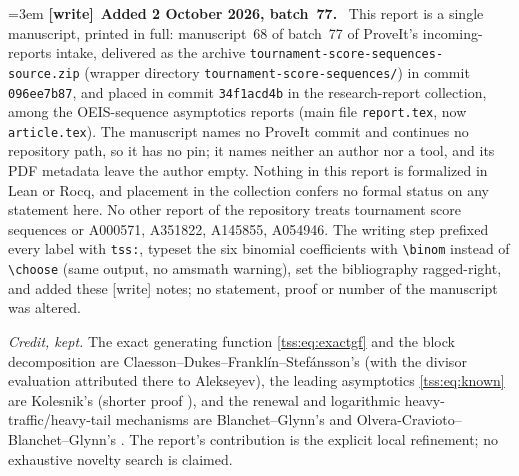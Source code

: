 \documentclass[11pt]{article}
\theoremstyle{remark}\newtheorem{remark}[theorem]{Remark}
\theoremstyle{definition}\newtheorem{definition}[theorem]{Definition}
\newenvironment{writenote}[1][]{\par\smallskip\begingroup\small\emergencystretch=3em
 \noindent\textbf{[write]}\if\relax\detokenize{#1}\relax\else~\textbf{#1.}\fi\ }%
 {\par\endgroup\smallskip}
\begin{document}
\begin{writenote}[Added 2 October 2026, batch~77]
This report is a single manuscript, printed in full: manuscript~68 of
batch~77 of ProveIt's incoming-reports intake, delivered as the archive
\texttt{tournament-\allowbreak score-\allowbreak sequences-\allowbreak source.zip}
(wrapper directory \texttt{tournament-\allowbreak score-\allowbreak sequences/})
in commit \texttt{096ee7b87}, and placed in commit \texttt{34f1acd4b} in the
research-report collection, among the OEIS-sequence asymptotics reports (main
file \texttt{report.tex}, now \texttt{article.tex}). The manuscript names no
ProveIt commit and continues no repository path, so it has no pin; it names
neither an author nor a tool, and its PDF metadata leave the author empty.
Nothing in this report is formalized in Lean or Rocq, and placement in the
collection confers no formal status on any statement here. No other report of
the repository treats tournament score sequences or A000571, A351822, A145855,
A054946. The writing step prefixed every label with \texttt{tss:}, typeset the
six binomial coefficients with \verb|\binom| instead of \verb|\choose| (same
output, no amsmath warning), set the bibliography ragged-right, and added these
\textsf{[write]} notes; no statement, proof or number of the manuscript was
altered.

\emph{Credit, kept.} The exact generating function \eqref{tss:eq:exactgf} and
the block decomposition are Claesson--Dukes--Frankl\'in--Stef\'ansson's
\cite{CDFS} (with the divisor evaluation attributed there to Alekseyev), the
leading asymptotics \eqref{tss:eq:known} are Kolesnik's \cite{Kolesnik} (shorter
proof \cite{BDK}), and the renewal and logarithmic heavy-traffic/heavy-tail
mechanisms are Blanchet--Glynn's and Olvera-Cravioto--Blanchet--Glynn's
\cite{BG,OCBG}. The report's contribution is the explicit local refinement;
no exhaustive novelty search is claimed.


\end{writenote}
\end{document}
